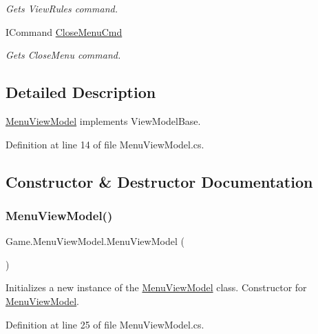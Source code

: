 \begin{DoxyCompactItemize}
\begin{DoxyCompactList}\small\item\em Gets View\+Rules command. \end{DoxyCompactList}\item 
I\+Command \mbox{\hyperlink{class_game_1_1_menu_view_model_aedcdb04f0e84651c3936e9025a0c268e}{Close\+Menu\+Cmd}}
\begin{DoxyCompactList}\small\item\em Gets Close\+Menu command. \end{DoxyCompactList}\end{DoxyCompactItemize}


\subsection{Detailed Description}
\mbox{\hyperlink{class_game_1_1_menu_view_model}{Menu\+View\+Model}} implements View\+Model\+Base. 



Definition at line 14 of file Menu\+View\+Model.\+cs.



\subsection{Constructor \& Destructor Documentation}
\mbox{\label{class_game_1_1_menu_view_model_ac1e0530bc099fda750ee5fcda33bccc1}} 
\subsubsection{\texorpdfstring{MenuViewModel()}{MenuViewModel()}}
{\footnotesize\ttfamily Game.\+Menu\+View\+Model.\+Menu\+View\+Model (\begin{DoxyParamCaption}{ }\end{DoxyParamCaption})}



Initializes a new instance of the \mbox{\hyperlink{class_game_1_1_menu_view_model}{Menu\+View\+Model}} class. Constructor for \mbox{\hyperlink{class_game_1_1_menu_view_model}{Menu\+View\+Model}}. 



Definition at line 25 of file Menu\+View\+Model.\+cs.



